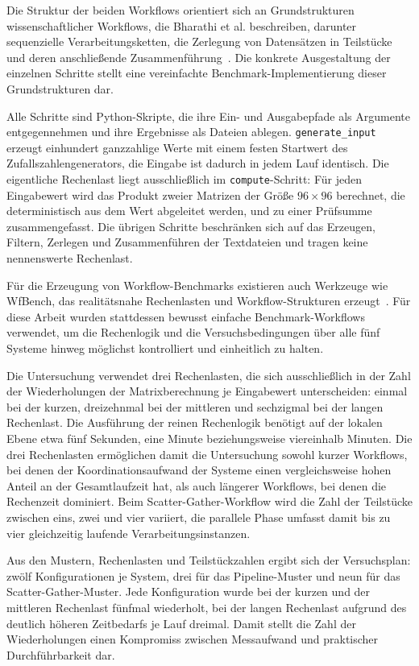 Die Struktur der beiden Workflows orientiert sich an
Grundstrukturen wissenschaftlicher Workflows, die Bharathi et al.
beschreiben, darunter sequenzielle Verarbeitungsketten, die
Zerlegung von Datensätzen in Teilstücke und deren anschließende
Zusammenführung~\cite[S.~3]{bharathi2008characterization}.
Die konkrete Ausgestaltung der einzelnen Schritte stellt eine
vereinfachte Benchmark-Implementierung dieser Grundstrukturen dar.

Alle Schritte sind Python-Skripte, die ihre Ein- und Ausgabepfade
als Argumente entgegennehmen und ihre Ergebnisse als Dateien
ablegen. \texttt{generate\_input} erzeugt einhundert ganzzahlige
Werte mit einem festen Startwert des Zufallszahlengenerators, die
Eingabe ist dadurch in jedem Lauf identisch. Die eigentliche
Rechenlast liegt ausschließlich im \texttt{compute}-Schritt: Für
jeden Eingabewert wird das Produkt zweier Matrizen der Größe
$96 \times 96$ berechnet, die deterministisch aus dem Wert
abgeleitet werden, und zu einer Prüfsumme zusammengefasst. Die
übrigen Schritte beschränken sich auf das Erzeugen, Filtern,
Zerlegen und Zusammenführen der Textdateien und tragen keine
nennenswerte Rechenlast.

Für die Erzeugung von Workflow-Benchmarks existieren auch Werkzeuge
wie WfBench, das realitätsnahe Rechenlasten und Workflow-Strukturen
erzeugt~\cite[S.~101]{wfbench2022}. Für diese Arbeit wurden
stattdessen bewusst einfache Benchmark-Workflows verwendet, um die
Rechenlogik und die Versuchsbedingungen über alle fünf Systeme
hinweg möglichst kontrolliert und einheitlich zu halten.

Die Untersuchung verwendet drei Rechenlasten, die sich
ausschließlich in der Zahl der Wiederholungen der Matrixberechnung
je Eingabewert unterscheiden: einmal bei der kurzen, dreizehnmal
bei der mittleren und sechzigmal bei der langen Rechenlast. Die
Ausführung der reinen Rechenlogik benötigt auf der lokalen Ebene
etwa fünf Sekunden, eine Minute beziehungsweise viereinhalb
Minuten. Die drei Rechenlasten ermöglichen damit die Untersuchung
sowohl kurzer Workflows, bei denen der Koordinationsaufwand der
Systeme einen vergleichsweise hohen Anteil an der Gesamtlaufzeit
hat, als auch längerer Workflows, bei denen die Rechenzeit
dominiert. Beim Scatter-Gather-Workflow wird die Zahl der
Teilstücke zwischen eins, zwei und vier variiert, die parallele
Phase umfasst damit bis zu vier gleichzeitig laufende
Verarbeitungsinstanzen.

Aus den Mustern, Rechenlasten und Teilstückzahlen ergibt sich der
Versuchsplan: zwölf Konfigurationen je System, drei für das Pipeline-Muster und neun für das Scatter-Gather-Muster. Jede Konfiguration wurde bei der kurzen und der mittleren Rechenlast fünfmal wiederholt, bei der langen Rechenlast aufgrund des deutlich höheren Zeitbedarfs je Lauf dreimal. Damit stellt die Zahl der Wiederholungen einen Kompromiss zwischen Messaufwand und praktischer Durchführbarkeit dar.


